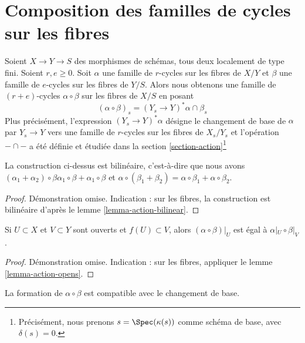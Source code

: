 \section{Composition des familles de cycles sur les fibres} 
\label{section-compose-families} 

\noindent
 Soient $X \to Y \to S$ des morphismes de schémas, tous deux localement de type fini. 
Soient $r, e \geq 0$. Soit $\alpha$ une famille de $r$-cycles 
sur les fibres de  $X/Y$  et  $\beta$  une famille de  $e$-cycles sur les
 fibres de  $Y/S$. Alors nous obtenons une famille 
de  $(r + e)$-cycles $\alpha \circ \beta$  sur les fibres de  $X/S$
  en posant 
$$
(\alpha \circ \beta)_s = (Y_s \to Y)^*\alpha \cap \beta_s
$$
 Plus précisément, l'expression $(Y_s \to Y)^*\alpha$ désigne 
le changement de base de $\alpha$  par  $Y_s \to Y$  vers une famille de  $r$-cycles 
sur les fibres de  $X_s/Y_s$  et l'opération  $- \cap -$
  a été définie et étudiée dans la section \ref{section-action}\footnote{Précisément, 
nous prenons $s = \Spec(\kappa(s))$ comme schéma de base, avec $\delta(s) = 0$.} 

\begin{lemma} 
\label{lemma-construction-bilinear} La 
construction ci-dessus est bilinéaire, c'est-à-dire que nous avons  
$(\alpha_1 + \alpha_2) \circ \beta \alpha_1 \circ \beta +
\alpha_1 \circ \beta$ et  $\alpha \circ (\beta_1 + \beta_2) =
\alpha \circ \beta_1 + \alpha \circ \beta_2$. 
\end{lemma} 

\begin{proof} 
Démonstration omise. Indication : sur les fibres, la construction est bilinéaire 
d'après le lemme \ref{lemma-action-bilinear}. 
\end{proof} 

\begin{lemma} 
\label{lemma-construction-opens} 
Si  $U \subset X$  et  $V \subset Y$  sont ouverts et  $f(U) \subset V$, alors  
$(\alpha \circ \beta)|_U$ est égal à  $\alpha|_U \circ \beta|_V$. 
\end{lemma} 

\begin{proof} 
Démonstration omise. Indication : sur les fibres, appliquer
 le lemme \ref{lemma-action-opens}. 
\end{proof} 

\begin{lemma} 
\label{lemma-construction-base-change} 
La formation de  $\alpha \circ \beta$  est compatible avec le changement de base. 
\end{lemma} 

